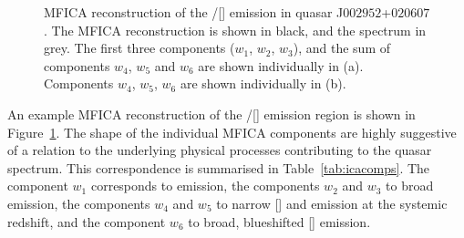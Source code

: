 \begin{figure}[t!]
   \captionsetup[subfigure]{labelformat=empty}
    \centering
    \subfloat[\label{fig:mfica_components_a}]{}
    \subfloat[\label{fig:mfica_components_b}]{}
    \caption[{MFICA reconstruction of the \hbns/[] emission in quasar J$002952$+$020607$.}]{MFICA reconstruction of the \hbns/[] emission in quasar J$002952$+$020607$. The MFICA reconstruction is shown in black, and the spectrum in grey. The first three components ($w_1$, $w_2$, $w_3$), and the sum of components $w_4$, $w_5$ and $w_6$ are shown individually in (a). Components $w_4$, $w_5$, $w_6$ are shown individually in (b).}
    \label{fig:mfica_components}
\end{figure}

An example MFICA reconstruction of the \hbns/[] emission region is shown in Figure~\ref{fig:mfica_components}.
The shape of the individual MFICA components are highly suggestive of a relation to the underlying physical processes contributing to the quasar spectrum.
This correspondence is summarised in Table~\ref{tab:icacomps}.
The component $w_1$ corresponds to  emission, the components $w_2$ and $w_3$ to broad \hb emission, the components $w_4$ and $w_5$ to narrow [] and \hb emission at the systemic redshift, and the component $w_6$ to broad, blueshifted [] emission.

